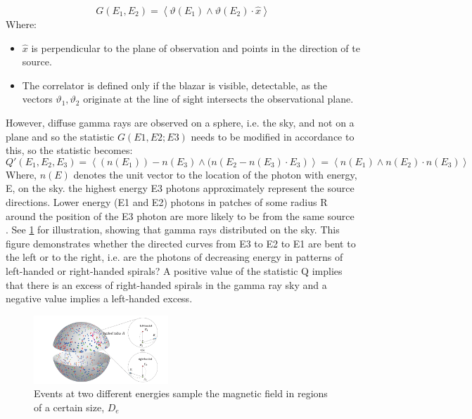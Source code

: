 \begin{equation} 
G(E_{1}, E_{2}) = \left \langle {\vartheta (E_{1}) \wedge \vartheta (E_{2}) \cdot \hat{x}} \right \rangle
\end{equation}
Where: 
\begin{itemize} 
\item $\hat{x}$ is perpendicular to the plane of observation and points in the direction of te source. 
\item The correlator is defined only if the blazar is visible, detectable, as the vectors $\vartheta_{1}, \vartheta_{2}$ originate at the line of sight intersects the observational plane. \cite{4}
\end{itemize}
However, diffuse gamma rays are observed on a sphere, i.e. the sky, and not on a plane and so the statistic $G(E1,E2;E3)$ needs to be modified in accordance to this, so the statistic becomes: 
\begin{equation}
Q'(E_{1}, E_{2}, E_{3}) = \left \langle {({n}(E_{1}))-{n}(E_{3})\wedge({n}(E_{2}-{n}(E_{3})\cdot {E_{3}}) } \right \rangle = \left \langle {{n}(E_{1}) \wedge {n}(E_{2})\cdot {n}(E_{3})} \right \rangle
\end{equation}
Where, $n(E)$ denotes the unit vector to the location of the photon with energy, E, on the sky. the highest energy E3 photons approximately represent the source directions. Lower energy (E1 and E2) photons in patches of some radius R around the position of the E3 photon are more likely to be from the same source \cite{2}.
See \cref{sky} for illustration, showing that gamma rays distributed on the sky. This figure demonstrates whether the directed curves from E3 to E2 to E1 are bent to the left or to the right, i.e. are the photons of decreasing energy in patterns of left-handed or right-handed spirals? A positive value of the statistic Q implies that there is an excess of right-handed spirals in the gamma ray sky and a negative value implies a left-handed excess.\cite{2}
\begin{figure}[hbt!] \label{sky}
\begin{center}
\includegraphics[width=0.451\textwidth]{figs/s.png}
\caption{Events at two different energies sample the magnetic field  in regions of a certain size, $D_{e} $}
\end{center}
\end{figure}
